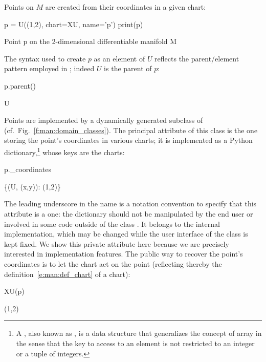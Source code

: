 Points on $M$ are created from their coordinates in a given chart:
\begin{NBin}
p = U((1,2), chart=XU, name='p')
print(p)
\end{NBin}
\begin{NBprint}
Point p on the 2-dimensional differentiable manifold M
\end{NBprint}
The syntax  used to create $p$ as an element of $U$
reflects the parent/element pattern employed in \Sage{}; indeed $U$
is the parent of $p$:
\begin{NBin}
p.parent()
\end{NBin}
\begin{NBoutM}
U
\end{NBoutM}
Points are implemented by a dynamically generated subclass of
 (cf.\ Fig.~\ref{f:man:domain_classes}).
The principal attribute of this class is the one storing the point's coordinates
in various charts; it is implemented as
a Python dictionary,\footnote{A ,
also known as , is a
data structure that generalizes the concept of array in the sense that the
key to access to an element is not restricted to an integer or a tuple of integers.} whose keys are the charts:
\begin{NBin}
p._coordinates
\end{NBin}
\begin{NBoutM}
\{(U, (x,y)): (1,2)\}
\end{NBoutM}
The leading underscore in the name  is a notation
convention to specify that this attribute is a  one:
the dictionary  should
not be manipulated by the end user or involved in some code
outside of the class .
It belongs to the internal implementation, which may be changed while
the user interface of the class  is kept fixed. We show
this private attribute here
because we are precisely interested in implementation features.
The public way to recover the point's coordinates is to let the chart act on
the point (reflecting thereby the definition~\eqref{e:man:def_chart} of a chart):
\begin{NBin}
XU(p)
\end{NBin}
\begin{NBoutM}
(1,2)
\end{NBoutM}

